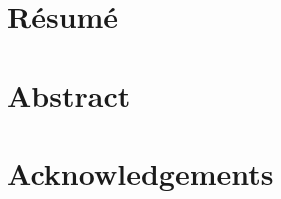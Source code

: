 \documentclass{report}
\begin{document}
  
   
  
 
\newpage  
\section*{Résumé}
  

\newpage
\section*{Abstract}

  
\newpage  
\section*{Acknowledgements} 

\newpage       
  
  
\tableofcontents   
\newpage      
\end{document}
